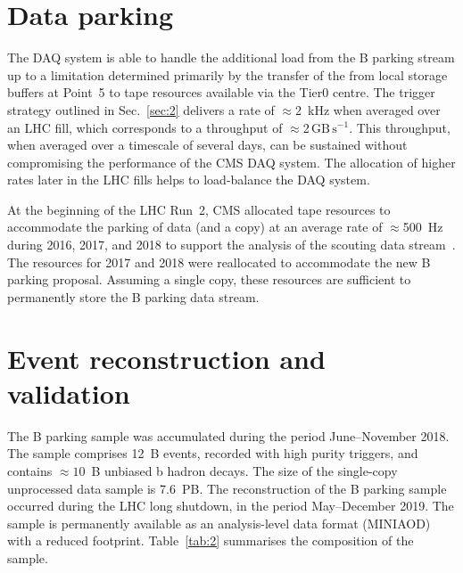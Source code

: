 \documentclass{webofc}
\newcommand{\gbs}{\ensuremath{\,\textrm{GB}\,\textrm{s}^{-1}}\xspace}
\begin{document}
\section{Data parking}
\label{sec:3}

The DAQ system is able to handle the additional load from the B
parking stream up to a limitation determined primarily by the transfer
of the from local storage buffers at Point~5 to tape resources
available via the Tier0 centre. The trigger strategy outlined in
Sec.~\ref{sec:2} delivers a rate of ${\approx}$2~kHz when averaged
over an LHC fill, which corresponds to a throughput of
${\approx}$2\gbs. This throughput, when averaged over a timescale of
several days, can be sustained without compromising the performance of
the CMS DAQ system. 
The allocation of higher rates later in the LHC fills helps to
load-balance the DAQ system.

At the beginning of the LHC Run~2, CMS allocated tape resources to
accommodate the parking of data (and a copy) at an average rate of
${\approx}$500~Hz during 2016, 2017, and 2018 to support the analysis
of the scouting data stream~\cite{parking-dps}. The resources for 2017
and 2018 were reallocated to accommodate the new B parking proposal.
Assuming a single copy, these resources are sufficient to permanently
store the B parking data stream.

\section{Event reconstruction and validation}
\label{sec:4}

The B parking sample was accumulated during the period June--November
2018. The sample comprises 12~B events, recorded with high purity
triggers, and contains ${\approx}10$~B unbiased b hadron decays. The
size of the single-copy unprocessed data sample is 7.6~PB. The
reconstruction of the B parking sample occurred during the LHC long
shutdown, in the period May--December 2019. The sample is permanently
available as an analysis-level data format (MINIAOD) with a reduced
footprint. Table~\ref{tab:2} summarises the composition of the sample. 
\end{document}
